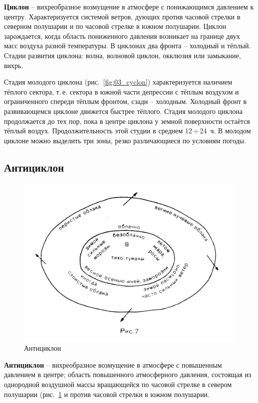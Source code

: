 \documentclass[a4paper, 12pt, twoside, final, book, russian, fittopage, cyremdash, openright]{ncc}
\newcommand{\otdo}{\,\ensuremath{\div}\,}
\begin{document}
\textbf{Циклон} \--- вихреобразное возмущение в
атмосфере с понижающимся давлением к центру. Характеризуется системой
ветров, дующих против часовой стрелки в северном полушарии и по
часовой стрелке в южном полушарии. Циклон зарождается, когда область
пониженного давления возникает на границе двух масс воздуха разной
температуры. В циклонах два фронта \--- холодный и тёплый. Стадии
развития циклона: волна, волновой циклон, окклюзия или замыкание,
вихрь.

Стадия молодого циклона (рис.~\ref{fig:03_cyclon}) характеризуется
наличием тёплого сектора, т.\,е. сектора в южной части депрессии с
тёплым воздухом и ограниченного спереди тёплым фронтом, сзади \---
холодным. Холодный фронт в развивающемся циклоне движется быстрее
тёплого. Стадия молодого циклона продолжается до тех пор, пока в
центре циклона у земной поверхности остаётся тёплый
воздух. Продолжительность этой студии в среднем 12\otdo{}24~ч. В молодом
циклоне можно выделить три зоны, резко различающиеся по условиям
погоды.

\subsection{Антициклон}
\label{sec:anticyclon}

\begin{figure}[htb]
   \centering
   \includegraphics[scale=1.0]{04_anticyclon.pdf}
   \caption{Антициклон}
   \label{fig:04_anticyclon}
\end{figure}

\textbf{Антициклон} \--- вихреобразное возмущение в
атмосфере с повышенным давлением в центре; область повышенного
атмосферного давления, состоящая из однородной воздушной массы
вращающейся по часовой стрелке в севером полушарии
(рис.~\ref{fig:04_anticyclon} и против часовой стрелки в южном
полушарии.
\end{document}
